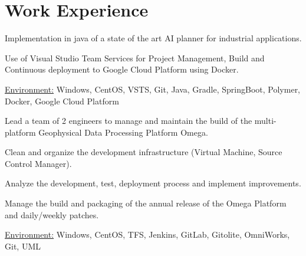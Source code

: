 \documentclass[10pt,letterpaper]{resume/resume}
\begin{document}
  \begin{minipage}[t]{\linewidth}
    \section{Work Experience}


\par Implementation in java of a state of the art AI planner for industrial applications.
\par Use of Visual Studio Team Services for Project Management, Build and Continuous deployment to Google Cloud Platform using Docker.
\par\underline{Environment:} Windows, CentOS, VSTS, Git, Java, Gradle, SpringBoot, Polymer, Docker, Google Cloud Platform

\par Lead a team of 2 engineers to manage and maintain the build of the multi-platform Geophysical Data Processing Platform Omega. 
\par Clean and organize the development infrastructure (Virtual Machine, Source Control Manager). 
\par Analyze the development, test, deployment process and implement improvements.
\par Manage the build and packaging of the annual release of the Omega Platform and daily/weekly patches.
\par\underline{Environment:} Windows, CentOS, TFS, Jenkins, GitLab, Gitolite, OmniWorks, Git, UML
%
%


\end{minipage}
\end{document}
